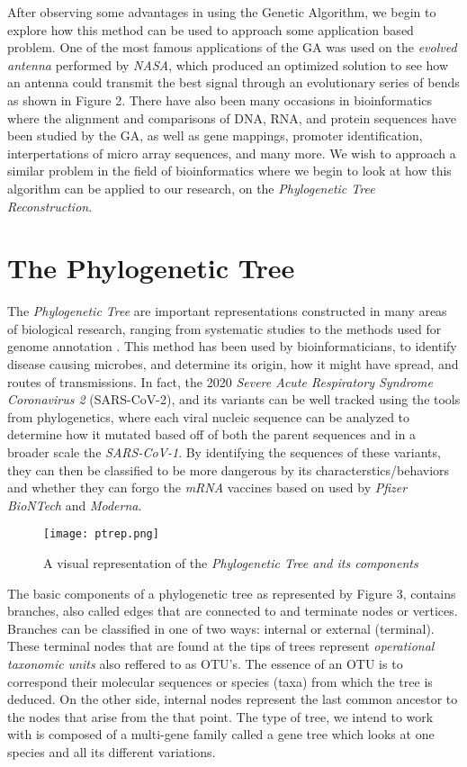 After observing some advantages in using the Genetic Algorithm, we begin to explore how this method can be used to approach some application based problem. One of the most famous applications of the GA was used on the \emph{evolved antenna} performed by \emph{NASA}, which produced an optimized solution to see how an antenna could transmit the best signal through an evolutionary series of bends as shown in Figure 2. There have also been many occasions in bioinformatics where the alignment and comparisons of DNA, RNA, and protein sequences have been studied by the GA, as well as gene mappings, promoter identification, interpertations of micro array sequences, and many more. We wish to approach a similar problem in the field of bioinformatics where we begin to look at how this algorithm can be applied to our research, on the \emph{Phylogenetic Tree Reconstruction}. 

\section{The Phylogenetic Tree}

The \emph{Phylogenetic Tree} are important representations constructed in many areas of biological research, ranging from systematic studies to the methods used for genome annotation \cite{Money}. This method has been used by bioinformaticians, to identify disease causing microbes, and determine its origin, how it might have spread, and routes of transmissions. In fact, the 2020 \emph{Severe Acute Respiratory Syndrome Coronavirus 2} (SARS-CoV-2), and its variants can be well tracked using the tools from phylogenetics, where each viral nucleic sequence can be analyzed to determine how it mutated based off of both the parent sequences and in a broader scale the \emph{SARS-CoV-1}. By identifying the sequences of these variants, they can then be classified to be more dangerous by its characterstics/behaviors and whether they can forgo the \emph{mRNA} vaccines based on used by \emph{Pfizer BioNTech} and \emph{Moderna}. 

\begin{figure}[h]
\centering
\texttt{[image: ptrep.png]}
\caption{A visual representation of the \emph{Phylogenetic Tree and its components} \cite{Gupta}}
\end{figure}

The basic components of a phylogenetic tree as represented by Figure 3, contains branches, also called edges that are connected to and terminate nodes or vertices. Branches can be classified in one of two ways: internal or external (terminal). These terminal nodes that are found at the tips of trees represent \emph{operational taxonomic units} also reffered to as OTU's. The essence of an OTU is to correspond their molecular sequences or species (taxa) from which the tree is deduced. On the other side, internal nodes represent the last common ancestor to the nodes that arise from the that point. The type of tree, we intend to work with is composed of a multi-gene family called a gene tree which looks at one species and all its different variations.

